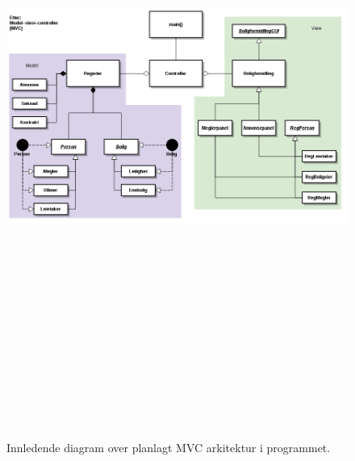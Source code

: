 \begin{figure}[ht]
\begin{center}
 \includegraphics[angle=90, height=21cm]{./img/appendix/diagram/moduler_og_relasjoner.png}
 \caption[MVC - første utkast]{Innledende diagram over planlagt MVC arkitektur i programmet.}
 \label{fig:mvc_innledende}
  \end{center}
\end{figure}

